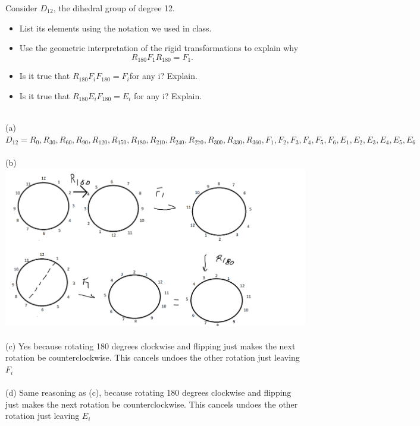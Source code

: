 \documentclass[titlepage]{article}
\newenvironment{problem}[2][Problem]{\begin{trivlist}
\item[\hskip \labelsep {\bfseries #1}\hskip \labelsep {\bfseries #2.}]}{\end{trivlist}}
\begin{document}
\begin{problem}{3}
Consider $D_{12}$, the dihedral group of degree 12.
\begin{itemize}
\item[(a)] List its elements using the notation we used in class.
\item[(b)] Use the geometric interpretation of the rigid transformations to explain why $$ R_{180}F_1R_{180} = F_1.$$
\item[(c)] Is it true that $R_{180}F_iF_{180} = F_i $for any i? Explain. 
\item[(d)] Is it true that $R_{180}E_iF_{180} = E_i$ for any i? Explain. 
\end{itemize}
\hrulefill \\
(a)\\$D_{12} = {R_0, R_{30},R_{60},R_{90},R_{120},R_{150},R_{180},R_{210},R_{240},R_{270},R_{300},R_{330},R_{360},F_1,F_2,F_3,F_4,F_5,F_6,E_1,E_2,E_3,E_4,E_5,E_6}$
\\ \\(b)\\

\includegraphics[scale =0.3]{graphically.png}
\\ \\
(c) Yes because rotating 180 degrees clockwise and flipping just makes the next rotation be counterclockwise. This cancels undoes the other rotation just leaving $F_i$
\\ \\
(d) Same reasoning as (c), because rotating 180 degrees clockwise and flipping just makes the next rotation be counterclockwise. This cancels undoes the other rotation just leaving $E_i$

\end{problem}
\end{document}
